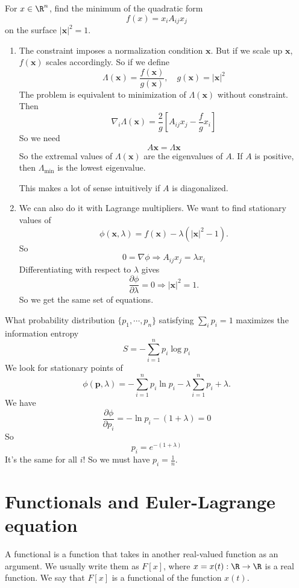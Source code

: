 \documentclass[a4paper]{article}
\begin{document}
\begin{eg}
  For $x\in \R^n$, find the minimum of the quadratic form
  \[
    f(x) = x_i A_{ij}x_j
  \]
  on the surface $|\mathbf{x}|^2 = 1$.

  \begin{enumerate}
  \item The constraint imposes a normalization condition $\mathbf{x}$. But if we scale up $\mathbf{x}$, $f(\mathbf{x})$ scales accordingly. So if we define
    \[
      \Lambda(\mathbf{x}) = \frac{f(\mathbf{x})}{g(\mathbf{x})},\quad g(\mathbf{x}) = |\mathbf{x}|^2
    \]
    The problem is equivalent to minimization of $\Lambda (\mathbf{x})$ without constraint. Then
    \[
      \nabla_i \Lambda(\mathbf{x}) = \frac{2}{g}\left[A_{ij} x_j - \frac{f}{g} x_i\right]
    \]
    So we need
    \[
      A\mathbf{x} = \Lambda \mathbf{x}
    \]
    So the extremal values of $\Lambda (\mathbf{x})$ are the eigenvalues of $A$. If $A$ is positive, then $\Lambda_{\min}$ is the lowest eigenvalue.

    This makes a lot of sense intuitively if $A$ is diagonalized.

  \item We can also do it with Lagrange multipliers. We want to find stationary values of 
    \[
      \phi(\mathbf{x}, \lambda) = f(\mathbf{x}) - \lambda(|\mathbf{x}|^2 - 1).
    \]
    So
    \[
      0 = \nabla \phi \Rightarrow  A_{ij} x_j = \lambda x_i
    \]
    Differentiating with respect to $\lambda$ gives
    \[
      \frac{\partial \phi}{\partial \lambda} = 0 \Rightarrow  |\mathbf{x}|^2 = 1.
    \]
    So we get the same set of equations.
  \end{enumerate}
\end{eg}

\begin{eg}
  What probability distribution $\{p_1, \cdots, p_n\}$ satisfying $\sum_i p_i = 1$ maximizes the information entropy
  \[
    S = - \sum_{i = 1}^n p_i \log p_i
  \]
  We look for stationary points of
  \[
    \phi(\mathbf{p}, \lambda) = -\sum_{i = 1}^n p_i \ln p_i - \lambda\sum_{i = 1}^n p_i + \lambda.
  \]
  We have
  \[
    \frac{\partial \phi}{\partial p_i}= - \ln p_i - (1 + \lambda) = 0
  \]
  So
  \[
    p_i = e^{-(1 + \lambda)}
  \]
  It's the same for all $i$! So we must have $p_i = \frac{1}{n}$.
\end{eg}
\section{Functionals and Euler-Lagrange equation}
\begin{defi}[Functional]
  A functional is a function that takes in another real-valued function as an argument. We usually write them as $F[x]$, where $x = x(t): \R \to \R$ is a real function. We say that $F[x]$ is a functional of the function $x(t)$.
\end{defi}
\end{document}
